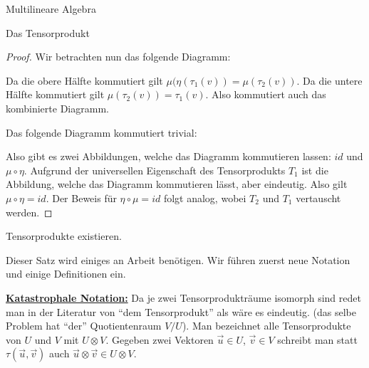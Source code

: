 \documentclass{report}
\newcommand*{\newpar}{\par\vspace{\baselineskip}\noindent}
\newcommand{\tbf}[1]{\textbf{#1}}
\newcommand{\ul}[1]{\underline{#1}}
\renewcommand{\vu}{\vec{u}}
\newcommand{\vv}{\vec{v}}
\begin{document}
\begin{chapter}{Multilineare Algebra}
\begin{section}{Das Tensorprodukt}
\begin{proof}
 \newpar
 \clearpage
 \noindent Wir betrachten nun das folgende Diagramm:
  \begin{figure}[h!]
    \centering
 \end{figure}
 \newpar
 Da die obere Hälfte kommutiert gilt $\mu (\eta(\tau_1(v)) = \mu(\tau_2(v))$. Da die untere Hälfte kommutiert gilt $\mu(\tau_2(v))= \tau_1(v)$. Also kommutiert auch das kombinierte Diagramm.
 \newpar
 Das folgende Diagramm kommutiert trivial:
 \begin{figure}[h!]
    \centering
 \end{figure}
 \newpar
 Also gibt es zwei Abbildungen, welche das Diagramm kommutieren lassen: $id$ und $\mu \circ \eta$. Aufgrund der universellen Eigenschaft des Tensorprodukts $T_1$ ist die Abbildung, welche das Diagramm kommutieren lässt, aber eindeutig. Also gilt $\mu \circ \eta = id$. Der Beweis für $\eta \circ \mu = id$ folgt analog, wobei $T_2$ und $T_1$ vertauscht werden.
 \end{proof}
 \begin{theorem}
  Tensorprodukte existieren.
 \end{theorem}
  Dieser Satz wird einiges an Arbeit benötigen. Wir führen zuerst neue Notation und einige Definitionen ein.
  \newpar
  \noindent \ul{\tbf{Katastrophale Notation:}} Da je zwei Tensorprodukträume isomorph sind redet man in der Literatur von ``dem Tensorprodukt'' als wäre es eindeutig. (das selbe Problem hat ``der'' Quotientenraum $V / U$). Man bezeichnet alle Tensorprodukte von $U$ und $V$ mit $U \otimes V$. Gegeben zwei Vektoren $\vu \in U$, $\vv \in V$ schreibt man statt $\tau(\vu, \vv)$ auch $\vu \otimes \vv \in U \otimes V$.

\end{section}
\end{chapter}
\end{document}
